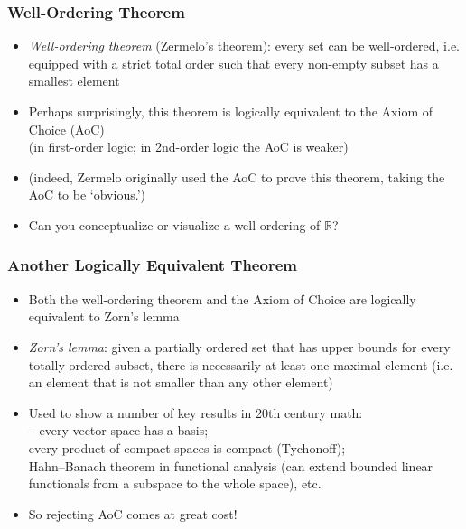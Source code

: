 \begin{frame}
\frametitle{Well-Ordering Theorem}

\begin{itemize}[<+->]

\item \emph{Well-ordering theorem} (Zermelo's theorem): every set can be well-ordered, i.e. equipped with a strict total order such that every non-empty subset has a smallest element

\item Perhaps surprisingly, this theorem is logically equivalent to the Axiom of Choice (AoC) \\ (in first-order logic; in 2nd-order logic the AoC is weaker)
\item[] (indeed, Zermelo originally used the AoC to prove this theorem, taking the AoC to be `obvious.')

\item Can you conceptualize or visualize a well-ordering of $\mathbb{R}$? 

\end{itemize}
\end{frame}

\begin{frame}
\frametitle{Another Logically Equivalent Theorem}

\begin{itemize}[<+->]

\item Both the well-ordering theorem and the Axiom of Choice are logically equivalent to Zorn's lemma

\item \emph{Zorn's lemma}: given a partially ordered set that has upper bounds for every totally-ordered subset, there is necessarily at least one maximal element (i.e. an element that is not smaller than any other element)

\item Used to show a number of key results in 20th century math: \\ -- every vector space has a basis; \\  every product of compact spaces is compact (Tychonoff); \\ Hahn--Banach theorem in functional analysis (can extend bounded linear functionals from a subspace to the whole space), etc. 

\item So rejecting AoC comes at great cost! 


\end{itemize}
\end{frame}

